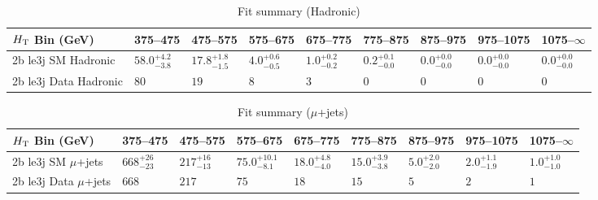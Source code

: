 \documentclass[8pt]{article}
\def\scalht{\mbox{$H_{\rm{T}}$}\xspace}
\newcommand\T{\rule{0pt}{2.6ex}}
\begin{document}
\begin{table}[ht!]
\caption{Fit summary (Hadronic)}
\label{tab:ensemble-summary}
\centering
\begin{tabular}{ lllllllll }

\hline
\scalht Bin (GeV)       & 375--475                       & 475--575                       & 575--675                       & 675--775                       & 775--875                       & 875--975                       & 975--1075                      & 1075--$\infty$                 \\ [1.000000ex]
\hline
2b le3j SM Hadronic\T   & $58.0^{+4.2}_{-3.8}$           & $17.8^{+1.8}_{-1.5}$           & $4.0^{+0.6}_{-0.5}$            & $1.0^{+0.2}_{-0.2}$            & $0.2^{+0.1}_{-0.0}$            & $0.0^{+0.0}_{-0.0}$            & $0.0^{+0.0}_{-0.0}$            & $0.0^{+0.0}_{-0.0}$            \\ 
2b le3j Data Hadronic\T & $80$                           & $19$                           & $8$                            & $3$                            & $0$                            & $0$                            & $0$                            & $0$                            \\ 
\hline

\end{tabular}
\end{table}
\begin{table}[ht!]
\caption{Fit summary ($\mu$+jets)}
\label{tab:ensemble-summary}
\centering
\begin{tabular}{ lllllllll }

\hline
\scalht Bin (GeV)       & 375--475                       & 475--575                       & 575--675                       & 675--775                       & 775--875                       & 875--975                       & 975--1075                      & 1075--$\infty$                 \\ [1.000000ex]
\hline
2b le3j SM $\mu$+jets\T & $668^{+26}_{-23}$              & $217^{+16}_{-13}$              & $75.0^{+10.1}_{-8.1}$          & $18.0^{+4.8}_{-4.0}$           & $15.0^{+3.9}_{-3.8}$           & $5.0^{+2.0}_{-2.0}$            & $2.0^{+1.1}_{-1.9}$            & $1.0^{+1.0}_{-1.0}$            \\ 
2b le3j Data $\mu$+jets\T & $668$                          & $217$                          & $75$                           & $18$                           & $15$                           & $5$                            & $2$                            & $1$                            \\ 
\hline

\end{tabular}
\end{table}
\end{document}
